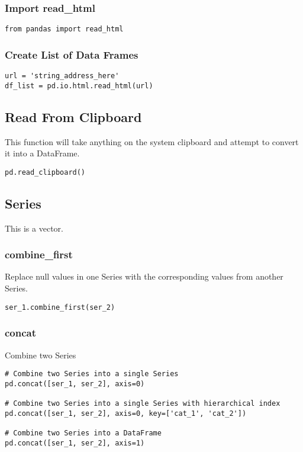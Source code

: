 %
\subsubsection{Import read\_html}
\begin{lstlisting}
from pandas import read_html
\end{lstlisting}

%
\subsubsection{Create List of Data Frames}
\begin{lstlisting}
url = 'string_address_here'
df_list = pd.io.html.read_html(url)
\end{lstlisting}

\subsection{Read From Clipboard}
This function will take anything on the system clipboard and attempt to convert
it into a DataFrame.
\begin{lstlisting}
pd.read_clipboard()
\end{lstlisting}

\subsection{Series}
This is a vector.

%
\subsubsection{combine\_first}
Replace null values in one Series with the corresponding values from another
Series.
\begin{lstlisting}
ser_1.combine_first(ser_2)
\end{lstlisting}

%
\subsubsection{concat}
Combine two Series
\begin{lstlisting}
# Combine two Series into a single Series
pd.concat([ser_1, ser_2], axis=0)

# Combine two Series into a single Series with hierarchical index
pd.concat([ser_1, ser_2], axis=0, key=['cat_1', 'cat_2'])

# Combine two Series into a DataFrame
pd.concat([ser_1, ser_2], axis=1)
\end{lstlisting}


